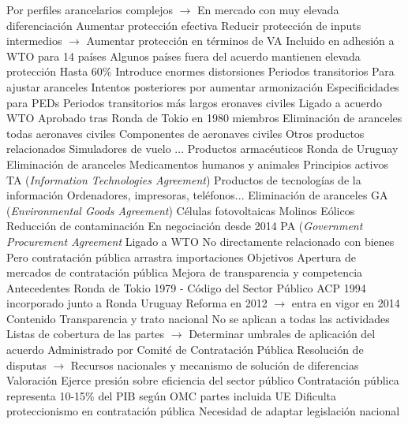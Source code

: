 \documentclass{nuevotema}
\begin{document}
\begin{esquemal}
				\4[] Por perfiles arancelarios complejos
				\4[] $\to$ En mercado con muy elevada diferenciación
				\4 Aumentar protección efectiva
				\4[] Reducir protección de inputs intermedios
				\4[] $\to$ Aumentar protección en términos de VA
				\4 Incluido en adhesión a WTO para 14 países
				\4 Algunos países fuera del acuerdo mantienen elevada protección
				\4[] Hasta 60\%
				\4[] Introduce enormes distorsiones
				\4 Periodos transitorios
				\4[] Para ajustar aranceles
				\4 Intentos posteriores por aumentar armonización
				\4[] Especificidades para PEDs
				\4[] Periodos transitorios más largos
			\3 eronaves civiles
				\4 Ligado a acuerdo WTO
				\4 Aprobado tras Ronda de Tokio en 1980
				 miembros
				\4 Eliminación de aranceles
				\4[] todas aeronaves civiles
				\4[]  Componentes de aeronaves civiles
				\4[] Otros productos relacionados
				\4[] Simuladores de vuelo
				\4[] ...
			\3 Productos armacéuticos
				\4 Ronda de Uruguay
				\4 Eliminación de aranceles
				\4 Medicamentos humanos y animales
				\4 Principios activos
			\3 TA (\textit{Information Technologies Agreement})
				\4 Productos de tecnologías de la información
				\4 Ordenadores, impresoras, teléfonos...
				\4 Eliminación de aranceles
			\3 GA (\textit{Environmental Goods Agreement})
				\4 Células fotovoltaicas
				\4 Molinos Eólicos
				\4 Reducción de contaminación
				\4 En negociación desde 2014
			\3 PA (\textit{Government Procurement Agreement}
				\4 Ligado a WTO
				\4 No directamente relacionado con bienes
				\4 Pero contratación pública arrastra importaciones
				\4 Objetivos
				\4[] Apertura de mercados de contratación pública
				\4[] Mejora de transparencia y competencia
				\4 Antecedentes
				\4[] Ronda de Tokio 1979 - Código del Sector Público
				\4[] ACP 1994 incorporado junto a Ronda Uruguay
				\4[] Reforma en 2012
				\4[] $\to$ entra en vigor en 2014
				\4 Contenido
				\4[] Transparencia y trato nacional
				\4[] No se aplican a todas las actividades
				\4[] Listas de cobertura de las partes
				\4[] $\to$ Determinar umbrales de aplicación del acuerdo
				\4[] Administrado por Comité de Contratación Pública
				\4[] Resolución de disputas
				\4[] $\to$ Recursos nacionales y mecanismo de solución de diferencias
				\4 Valoración
				\4[] Ejerce presión sobre eficiencia del sector público
				\4[] Contratación pública representa 10-15\% del PIB según OMC
				 partes incluida UE
				\4[] Dificulta proteccionismo en contratación pública
				\4[] Necesidad de adaptar legislación nacional

\end{esquemal}
\end{document}
